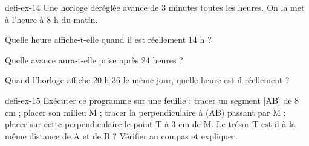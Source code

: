 \begin{blocEdition}{defi-ex-14}
Une horloge déréglée avance de 3 minutes toutes les heures. On la met à l’heure à 8 h du matin.\begin{questions}
\item Quelle heure affiche-t-elle quand il est réellement 14 h ?
\item Quelle avance aura-t-elle prise après 24 heures ?
\item Quand l’horloge affiche 20 h 36 le même jour, quelle heure est-il réellement ?
\end{questions}\par{}\par\par{}\par{}\par{}\par{}\par{}\par{}
\end{blocEdition}
\begin{blocEdition}{defi-ex-15}
Exécuter ce programme sur une feuille : tracer un segment [AB] de 8 cm ; placer son milieu M ; tracer la perpendiculaire à (AB) passant par M ; placer sur cette perpendiculaire le point T à 3 cm de M. Le trésor T est-il à la même distance de A et de B ? Vérifier au compas et expliquer.\par{}\par\par{}\par{}\par{}\par{}\par{}\par{}
\end{blocEdition}
